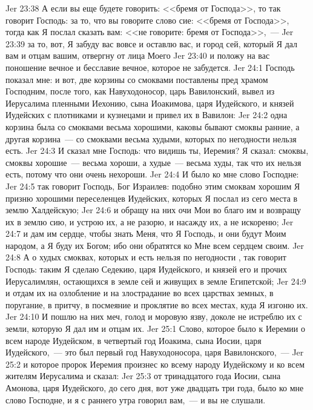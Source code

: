 \vs Jer 23:38 А если вы еще будете говорить: <<бремя от Господа>>, то так говорит Господь: за то, что вы говорите слово сие: <<бремя от Господа>>, тогда как Я послал сказать вам: <<не говорите: бремя от Господа>>,~---
\vs Jer 23:39 за то, вот, Я забуду вас вовсе и оставлю вас, и город сей, который Я дал вам и отцам вашим, отвергну от лица Моего
\vs Jer 23:40 и положу на вас поношение вечное и бесславие вечное, которое не забудется.
\vs Jer 24:1 Господь показал мне: и вот, две корзины со смоквами поставлены пред храмом Господним, после того, как Навуходоносор, царь Вавилонский, вывел из Иерусалима пленными Иехонию, сына Иоакимова, царя Иудейского, и князей Иудейских с плотниками и кузнецами и привел их в Вавилон:
\vs Jer 24:2 одна корзина была со смоквами весьма хорошими, каковы бывают смоквы ранние, а другая корзина~--- со смоквами весьма худыми, которых по негодности  нельзя есть.
\vs Jer 24:3 И сказал мне Господь: что видишь ты, Иеремия? Я сказал: смоквы, смоквы хорошие~--- весьма хороши, а худые~--- весьма худы, так что их нельзя есть, потому что они очень нехороши.
\rsbpar\vs Jer 24:4 И было ко мне слово Господне:
\vs Jer 24:5 так говорит Господь, Бог Израилев: подобно этим смоквам хорошим Я призню хорошими переселенцев Иудейских, которых Я послал из сего места в землю Халдейскую;
\vs Jer 24:6 и обращу на них очи Мои во благо им и возвращу их в землю сию, и устрою их, а не разорю, и насажду их, а не искореню;
\vs Jer 24:7 и дам им сердце, чтобы знать Меня, что Я Господь, и они будут Моим народом, а Я буду их Богом; ибо они обратятся ко Мне всем сердцем своим.
\vs Jer 24:8 А о худых смоквах, которых и есть нельзя по негодности , так говорит Господь: таким Я сделаю Седекию, царя Иудейского, и князей его и прочих Иерусалимлян, остающихся в земле сей и живущих в земле Египетской;
\vs Jer 24:9 и отдам их на озлобление и на злострадание во всех царствах земных, в поругание, в притчу, в посмеяние и проклятие во всех местах, куда Я изгоню их.
\vs Jer 24:10 И пошлю на них меч, голод и моровую язву, доколе не истреблю их с земли, которую Я дал им и отцам их.
\vs Jer 25:1 Слово, которое было к Иеремии о всем народе Иудейском, в четвертый год Иоакима, сына Иосии, царя Иудейского,~--- это был первый год Навуходоносора, царя Вавилонского,~---
\vs Jer 25:2 и которое пророк Иеремия произнес ко всему народу Иудейскому и ко всем жителям Иерусалима и сказал:
\vs Jer 25:3 от тринадцатого года Иосии, сына Амонова, царя Иудейского, до сего дня, вот уже двадцать три года, было ко мне слово Господне, и я с раннего утра говорил вам,~--- и вы не слушали.
